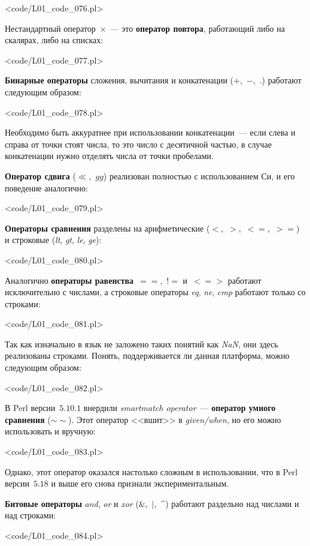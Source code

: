 \pr<code/L01_code_076.pl>

Нестандартный оператор~$\times$~--- это \textbf{оператор повтора}, работающий либо на скалярах, либо на списках:

\pr<code/L01_code_077.pl>

\textbf{Бинарные операторы} сложения, вычитания и конкатенации ($+$,~$-$,~$.$) работают следующим образом:

\pr<code/L01_code_078.pl>

Необходимо быть аккуратнее при использовании конкатенации~--- если слева и справа от точки стоят числа, то это число с десятичной частью, в случае конкатенации нужно отделять числа от точки пробелами.

\textbf{Оператор сдвига} ($\ll$,~$gg$) реализован полностью с использованием Си, и его поведение аналогично:

\pr<code/L01_code_079.pl>

\textbf{Операторы сравнения} разделены на арифметические ($<$,~$>$,~$<=$,~$>=$) и строковые (\textit{lt}, \textit{gt}, \textit{le}, \textit{ge}):

\pr<code/L01_code_080.pl>

Аналогично \textbf{операторы равенства}~$==$,~$!=$ и~$<=>$ работают исключительно с числами, а строковые операторы \textit{eq}, \textit{ne}, \textit{cmp} работают только со строками:

\pr<code/L01_code_081.pl>

Так как изначально в язык не заложено таких понятий как \textit{NaN}, они здесь реализованы строками.
Понять, поддерживается ли данная платформа, можно следующим образом:

\pr<code/L01_code_082.pl>

В Perl версии~$5.10.1$ внердили \textit{smartmatch operator}~--- \textbf{оператор умного сравнения} ($\sim\sim$).
Этот оператор <<вшит>> в \textit{given/when}, но его можно использовать и вручную:

\pr<code/L01_code_083.pl>

Однако, этот оператор оказался настолько сложным в использовании, что в Perl версии~$5.18$ и выше его снова признали экспериментальным.


\textbf{Битовые операторы} \textit{and}, \textit{or} и \textit{xor} ($\&$,~$|$,~$\^$) работают раздельно над числами и над строками:

\pr<code/L01_code_084.pl>


